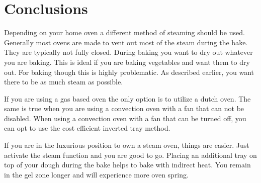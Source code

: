 \section{Conclusions}

\begin{table}[]
  \centering
  \caption{An overview of ovens and their different baking methods}
\end{table}

Depending on your home oven a different method
of steaming should be used. Generally most ovens
are made to vent out most of the steam during the
bake. They are typically not fully closed. During
baking you want to dry out whatever you are baking.
This is ideal if you are baking vegetables and
want them to dry out. For baking though this is
highly problematic. As described earlier, you
want there to be as much steam as possible.

If you are using a gas based oven the only option
is to utilize a dutch oven. The same is true when you
are using a convection oven with a fan that
can not be disabled. When using a convection
oven with a fan that can be turned off, you can
opt to use the cost efficient inverted tray
method.

If you are in the luxurious
position to own a steam oven, things are easier.
Just activate the steam function and you are
good to go. Placing an additional tray on top of your
dough during the bake helps to bake with indirect
heat. You remain in the gel zone longer and
will experience more oven spring.
